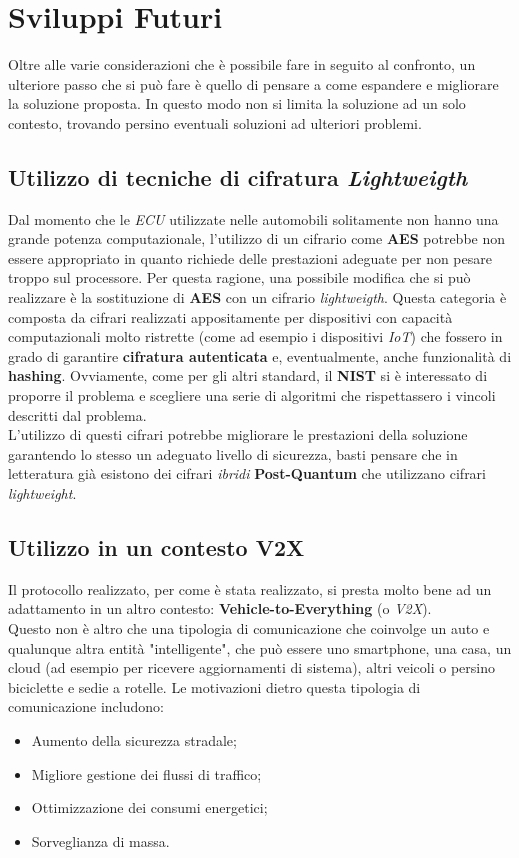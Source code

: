 \section{Sviluppi Futuri}
Oltre alle varie considerazioni che è possibile fare in seguito al confronto, un ulteriore passo che si può fare è quello di pensare a come espandere e migliorare la soluzione proposta. In questo modo non si limita la soluzione ad un solo contesto, trovando persino eventuali soluzioni ad ulteriori problemi.

\subsection{Utilizzo di tecniche di cifratura \emph{Lightweigth}}
Dal momento che le \emph{ECU} utilizzate nelle automobili solitamente non hanno una grande potenza computazionale, l'utilizzo di un cifrario come \textbf{AES} potrebbe non essere appropriato in quanto richiede delle prestazioni adeguate per non pesare troppo sul processore. Per questa ragione, una possibile modifica che si può realizzare è la sostituzione di \textbf{AES} con un cifrario \emph{lightweigth}. Questa categoria è composta da cifrari realizzati appositamente per dispositivi con capacità computazionali molto ristrette \cite{nist_lightweight} (come ad esempio i dispositivi \emph{IoT}) che fossero in grado di garantire \textbf{cifratura autenticata} e, eventualmente, anche funzionalità di \textbf{hashing}. Ovviamente, come per gli altri standard, il \textbf{NIST} si è interessato di proporre il problema e scegliere una serie di algoritmi che rispettassero i vincoli descritti dal problema.\\
L'utilizzo di questi cifrari potrebbe migliorare le prestazioni della soluzione garantendo lo stesso un adeguato livello di sicurezza, basti pensare che in letteratura già esistono dei cifrari \emph{ibridi} \textbf{Post-Quantum} che utilizzano cifrari \emph{lightweight}.

\subsection{Utilizzo in un contesto V2X}
Il protocollo realizzato, per come è stata realizzato, si presta molto bene ad un adattamento in un altro contesto: \textbf{Vehicle-to-Everything} (o \emph{V2X}).\\
Questo non è altro che una tipologia di comunicazione che coinvolge un auto e qualunque altra entità "intelligente", che può essere uno smartphone, una casa, un cloud (ad esempio per ricevere aggiornamenti di sistema), altri veicoli o persino biciclette e sedie a rotelle. Le motivazioni dietro questa tipologia di comunicazione includono:
\begin{itemize}
	\item Aumento della sicurezza stradale;
	\item Migliore gestione dei flussi di traffico;
	\item Ottimizzazione dei consumi energetici;
	\item Sorveglianza di massa. \cite{wikipedia_v2x}
\end{itemize}

